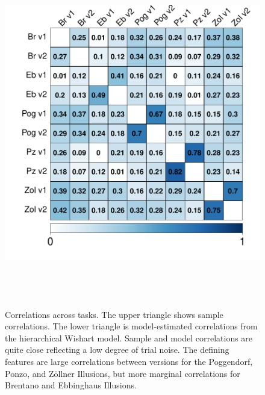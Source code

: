 \documentclass[man, 12pt]{apa7} %
\begin{document}
\begin{figure}
    \centering  %
    \includegraphics[width=6in, height=6in]{_figs/cor.pdf}
    \caption{Correlations across tasks.  The upper triangle shows sample correlations.  The lower triangle is model-estimated correlations from the hierarchical Wishart model.   Sample and model correlations are quite close reflecting a low degree of trial noise.  The defining features are large correlations between versions for the Poggendorf, Ponzo, and Zöllner Illusions, but more marginal correlations for Brentano and Ebbinghaus Illusions.}
    \label{fig:corPlot}
\end{figure}
\end{document}
